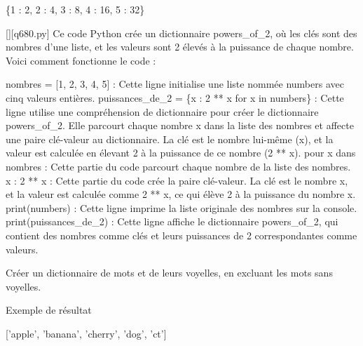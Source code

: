 \{1 : 2, 2 : 4, 3 : 8, 4 : 16, 5 : 32\}
        \par
        \begin{solution}
            \renewcommand{\nomfichier}{q680.py}
            \pythonfile{\chemincode \nomfichier}[][\nomfichier]
            Ce code Python crée un dictionnaire powers\_of\_2, où les clés sont des nombres d'une liste, et les valeurs sont 2 élevés à la puissance de chaque nombre. Voici comment fonctionne le code :

    nombres = [1, 2, 3, 4, 5] : Cette ligne initialise une liste nommée numbers avec cinq valeurs entières.
    puissances\_de\_2 = \{x : 2 ** x for x in numbers\} : Cette ligne utilise une compréhension de dictionnaire pour créer le dictionnaire powers\_of\_2. Elle parcourt chaque nombre x dans la liste des nombres et affecte une paire clé-valeur au dictionnaire. La clé est le nombre lui-même (x), et la valeur est calculée en élevant 2 à la puissance de ce nombre (2 ** x).
        pour x dans nombres : Cette partie du code parcourt chaque nombre de la liste des nombres.
        x : 2 ** x : Cette partie du code crée la paire clé-valeur. La clé est le nombre x, et la valeur est calculée comme 2 ** x, ce qui élève 2 à la puissance du nombre x.
    print(numbers) : Cette ligne imprime la liste originale des nombres sur la console.
    print(puissances\_de\_2) : Cette ligne affiche le dictionnaire powers\_of\_2, qui contient des nombres comme clés et leurs puissances de 2 correspondantes comme valeurs.
        \end{solution}
        

        \question
        Créer un dictionnaire de mots et de leurs voyelles, en excluant les mots sans voyelles.

Exemple de résultat

['apple', 'banana', 'cherry', 'dog', 'ct']

